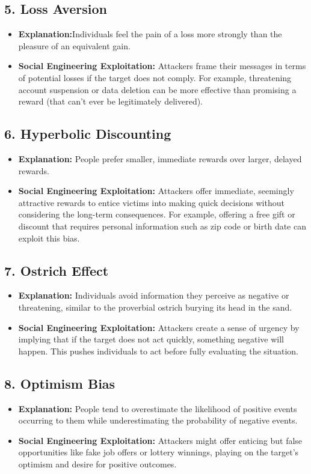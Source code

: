 \subsection{5. Loss Aversion}
\begin{itemize}
    \item \textbf{Explanation:}Individuals feel the pain of a loss more strongly than the pleasure of an equivalent gain.
    \item \textbf{Social Engineering Exploitation:} Attackers frame their messages in terms of potential losses if the target does not comply. For example, threatening account suspension or data deletion can be more effective than promising a reward (that can't ever be legitimately delivered).
\end{itemize}

\subsection{6. Hyperbolic Discounting}
\begin{itemize}
    \item \textbf{Explanation:} People prefer smaller, immediate rewards over larger, delayed rewards.
    \item \textbf{Social Engineering Exploitation:} Attackers offer immediate, seemingly attractive rewards to entice victims into making quick decisions without considering the long-term consequences. For example, offering a free gift or discount that requires personal information such as zip code or birth date can exploit this bias.

\end{itemize}

\subsection{7. Ostrich Effect}
\begin{itemize}
    \item \textbf{Explanation:} Individuals avoid information they perceive as negative or threatening, similar to the proverbial ostrich burying its head in the sand.
    \item \textbf{Social Engineering Exploitation:} Attackers create a sense of urgency by implying that if the target does not act quickly, something negative will happen. This pushes individuals to act before fully evaluating the situation.
\end{itemize}

\subsection{8. Optimism Bias}
\begin{itemize}
    \item \textbf{Explanation:} People tend to overestimate the likelihood of positive events occurring to them while underestimating the probability of negative events.
    \item \textbf{Social Engineering Exploitation:} Attackers might offer enticing but false opportunities like fake job offers or lottery winnings, playing on the target's optimism and desire for positive outcomes.
\end{itemize}

